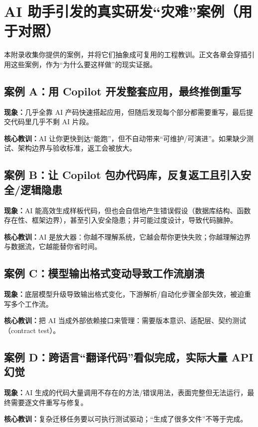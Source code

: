 \chapter{AI 助手引发的真实研发“灾难”案例（用于对照）}
\label{app:ai_disasters}

本附录收集你提供的案例，并将它们抽象成可复用的工程教训。正文各章会穿插引用这些案例，作为“为什么要这样做”的现实证据。

\section{案例 A：用 Copilot 开发整套应用，最终推倒重写}
\label{case:copilot_rewrite_all}
\textbf{现象：}几乎全靠 AI 产码快速搭起应用，但随后发现每个部分都需要重写，最后提交代码里几乎不剩 AI 片段。

\textbf{核心教训：}AI 让你更快到达“能跑”，但不自动带来“可维护/可演进”。如果缺少测试、架构边界与验收标准，返工会被放大。

\section{案例 B：让 Copilot 包办代码库，反复返工且引入安全/逻辑隐患}
\label{case:copilot_overdelegation}
\textbf{现象：}AI 能高效生成样板代码，但也会自信地产生错误假设（数据库结构、函数存在性、框架边界），甚至引入安全隐患；并可能过度设计，导致代码臃肿。

\textbf{核心教训：}AI 是放大器：你越不理解系统，它越会帮你更快失败；你越理解边界与数据流，它越能替你省时间。

\section{案例 C：模型输出格式变动导致工作流崩溃}
\label{case:format_shift_breaks_workflow}
\textbf{现象：}底层模型升级导致输出格式变化，下游解析/自动化步骤全部失效，被迫重写多个工作流。

\textbf{核心教训：}把 AI 当成外部依赖接口来管理：需要版本意识、适配层、契约测试（contract test）。

\section{案例 D：跨语言“翻译代码”看似完成，实际大量 API 幻觉}
\label{case:code_translation_hallucination}
\textbf{现象：}AI 生成的代码大量调用不存在的方法/错误用法，表面完整但无法运行，最终需要逐文件重写与修复。

\textbf{核心教训：}复杂迁移任务要以可执行测试驱动；“生成了很多文件”不等于完成。

